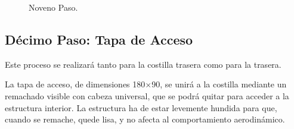 \begin{figure}[!htb]
\centering
{}
\caption{Noveno Paso. \label{fig:nov}}
\end{figure}
\pagebreak
\subsection{Décimo Paso: Tapa de Acceso}
Este proceso se realizará tanto para la costilla trasera como para la trasera.

La tapa de acceso, de dimensiones 180$\times$90, se unirá a la costilla mediante un remachado visible con cabeza universal, que se podrá quitar para acceder a la estructura interior. La estructura ha de estar levemente hundida para que, cuando se remache, quede lisa, y no afecta al comportamiento aerodinámico.

